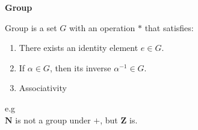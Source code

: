 \documentclass[aspectratio=169]{beamer}
\begin{document}
\begin{frame}{\textbf{Group}} 
    \begin{bee}[Definition] 
        Group is a set $G$ with an operation $\ast$ that satisfies: \\
         \begin{enumerate}[$\bullet$]
            \item There exists an identity element $e \in G$. 
            \item If $\alpha \in G$, then its inverse $\alpha^{-1} \in G$.
            \item Associativity
        \end{enumerate} 
    \end{bee} 
e.g \\ 
\hspace{5mm}$\mathbf{N}$ is not a group under $+$, but $\mathbf{Z}$ is.
\end{frame}
\end{document}
